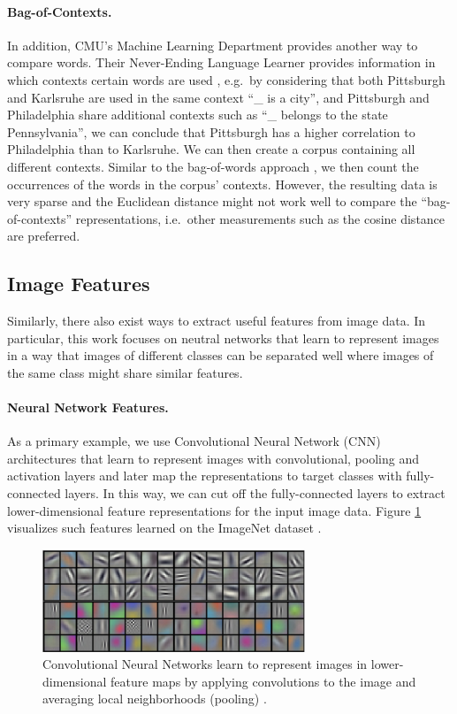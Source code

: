\paragraph{Bag-of-Contexts.} In addition, CMU's Machine Learning Department provides another way to compare words. Their Never-Ending Language Learner provides information in which contexts certain words are used \cite{nell_pairs}, e.g.\ by considering that both Pittsburgh and Karlsruhe are used in the same context ``\_ is a city'', and Pittsburgh and Philadelphia share additional contexts such as ``\_ belongs to the state Pennsylvania'', we can conclude that Pittsburgh has a higher correlation to Philadelphia than to Karlsruhe. We can then create a corpus containing all different contexts. Similar to the bag-of-words approach \cite{bow}, we then count the occurrences of the words in the corpus' contexts. However, the resulting data is very sparse and the Euclidean distance might not work well to compare the ``bag-of-contexts'' representations, i.e.\ other measurements such as the cosine distance are preferred.

\subsection{Image Features}
\label{sec:imagefeatures}

Similarly, there also exist ways to extract useful features from image data. In particular, this work focuses on neutral networks that learn to represent images in a way that images of different classes can be separated well where images of the same class might share similar features. 

\paragraph{Neural Network Features.} As a primary example, we use Convolutional Neural Network (CNN) architectures that learn to represent images with convolutional, pooling and activation layers and later map the representations to target classes with fully-connected layers. In this way, we can cut off the fully-connected layers to extract lower-dimensional feature representations for the input image data. Figure \ref{fig:cnnfeatures} visualizes such features learned on the ImageNet dataset \cite{krizhevsky2012imagenet}.

\begin{figure}[h]
    \centering
    \includegraphics[width=0.7\textwidth]{images/cnn_features}
    \caption{Convolutional Neural Networks learn to represent images in lower-dimensional feature maps by applying convolutions to the image and averaging local neighborhoods (pooling) \cite{krizhevsky2012imagenet}.}
    \label{fig:cnnfeatures}
\end{figure}

